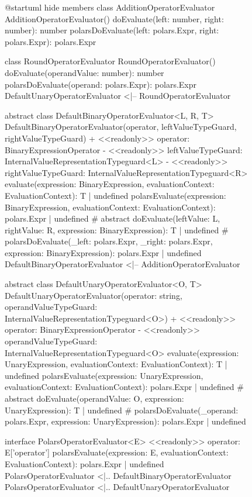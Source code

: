 \begin{figure}
	\begin{plantuml}
		@startuml
		hide members
		class AdditionOperatorEvaluator {
				AdditionOperatorEvaluator()
				doEvaluate(left: number, right: number): number
				polarsDoEvaluate(left: polars.Expr, right: polars.Expr): polars.Expr
			}

		class RoundOperatorEvaluator {
				RoundOperatorEvaluator()
				doEvaluate(operandValue: number): number
				polarsDoEvaluate(operand: polars.Expr): polars.Expr
			}
		DefaultUnaryOperatorEvaluator <|-- RoundOperatorEvaluator

		abstract class DefaultBinaryOperatorEvaluator<L, R, T> {
		DefaultBinaryOperatorEvaluator(operator, leftValueTypeGuard, rightValueTypeGuard)
		+ <<readonly>> operator: BinaryExpressionOperator
		- <<readonly>> leftValueTypeGuard: InternalValueRepresentationTypeguard<L>
		- <<readonly>> rightValueTypeGuard: InternalValueRepresentationTypeguard<R>
		evaluate(expression: BinaryExpression, evaluationContext: EvaluationContext): T | undefined
		polarsEvaluate(expression: BinaryExpression, evaluationContext: EvaluationContext): polars.Expr | undefined
		# {abstract} doEvaluate(leftValue: L, rightValue: R, expression: BinaryExpression): T | undefined
		# polarsDoEvaluate(_left: polars.Expr, _right: polars.Expr, expression: BinaryExpression): polars.Expr | undefined
		}
		DefaultBinaryOperatorEvaluator <|-- AdditionOperatorEvaluator

		abstract class DefaultUnaryOperatorEvaluator<O, T> {
		DefaultUnaryOperatorEvaluator(operator: string, operandValueTypeGuard: InternalValueRepresentationTypeguard<O>)
		+ <<readonly>> operator: BinaryExpressionOperator
		- <<readonly>> operandValueTypeGuard: InternalValueRepresentationTypeguard<O>
		evaluate(expression: UnaryExpression, evaluationContext: EvaluationContext): T | undefined
		polarsEvaluate(expression: UnaryExpression, evaluationContext: EvaluationContext): polars.Expr | undefined
		# {abstract} doEvaluate(operandValue: O, expression: UnaryExpression): T | undefined
		# polarsDoEvaluate(_operand: polars.Expr, expression: UnaryExpression): polars.Expr | undefined
		}

		interface PolarsOperatorEvaluator<E> {
				<<readonly>> operator: E['operator']
				polarsEvaluate(expression: E, evaluationContext: EvaluationContext): polars.Expr | undefined
			}
		PolarsOperatorEvaluator <|.. DefaultBinaryOperatorEvaluator
		PolarsOperatorEvaluator <|.. DefaultUnaryOperatorEvaluator


\end{plantuml}
\end{figure}
